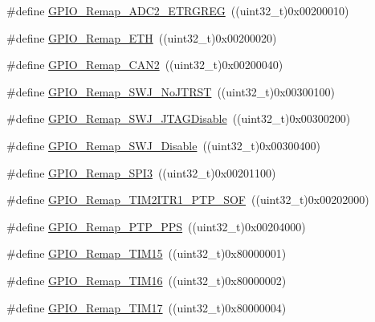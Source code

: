 \begin{DoxyCompactItemize}
\item 
\#define \mbox{\hyperlink{group___g_p_i_o___remap__define_gaa782a0c482f34507c82e4cd639bb747e}{G\+P\+I\+O\+\_\+\+Remap\+\_\+\+A\+D\+C2\+\_\+\+E\+T\+R\+G\+R\+EG}}~((uint32\+\_\+t)0x00200010)
\item 
\#define \mbox{\hyperlink{group___g_p_i_o___remap__define_gaf578688bb4d1a17fb3a103946e7c2eb7}{G\+P\+I\+O\+\_\+\+Remap\+\_\+\+E\+TH}}~((uint32\+\_\+t)0x00200020)
\item 
\#define \mbox{\hyperlink{group___g_p_i_o___remap__define_ga14c09a5050063b703fa07181afc56ee6}{G\+P\+I\+O\+\_\+\+Remap\+\_\+\+C\+A\+N2}}~((uint32\+\_\+t)0x00200040)
\item 
\#define \mbox{\hyperlink{group___g_p_i_o___remap__define_ga81009ef35f7f039365291cf4f6fc0c5b}{G\+P\+I\+O\+\_\+\+Remap\+\_\+\+S\+W\+J\+\_\+\+No\+J\+T\+R\+ST}}~((uint32\+\_\+t)0x00300100)
\item 
\#define \mbox{\hyperlink{group___g_p_i_o___remap__define_ga25fb8c789334694861444e48f486879d}{G\+P\+I\+O\+\_\+\+Remap\+\_\+\+S\+W\+J\+\_\+\+J\+T\+A\+G\+Disable}}~((uint32\+\_\+t)0x00300200)
\item 
\#define \mbox{\hyperlink{group___g_p_i_o___remap__define_gaf4832412d0ba344bb9147142cfcda828}{G\+P\+I\+O\+\_\+\+Remap\+\_\+\+S\+W\+J\+\_\+\+Disable}}~((uint32\+\_\+t)0x00300400)
\item 
\#define \mbox{\hyperlink{group___g_p_i_o___remap__define_gac7fd74244a9d53ca02cc86bb6543a689}{G\+P\+I\+O\+\_\+\+Remap\+\_\+\+S\+P\+I3}}~((uint32\+\_\+t)0x00201100)
\item 
\#define \mbox{\hyperlink{group___g_p_i_o___remap__define_ga0dc4bec540b9372479e63295fe68ac17}{G\+P\+I\+O\+\_\+\+Remap\+\_\+\+T\+I\+M2\+I\+T\+R1\+\_\+\+P\+T\+P\+\_\+\+S\+OF}}~((uint32\+\_\+t)0x00202000)
\item 
\#define \mbox{\hyperlink{group___g_p_i_o___remap__define_ga3e9d7808d1e50393afde08e4a45d18aa}{G\+P\+I\+O\+\_\+\+Remap\+\_\+\+P\+T\+P\+\_\+\+P\+PS}}~((uint32\+\_\+t)0x00204000)
\item 
\#define \mbox{\hyperlink{group___g_p_i_o___remap__define_gaead5c447875e8b384945424845452b82}{G\+P\+I\+O\+\_\+\+Remap\+\_\+\+T\+I\+M15}}~((uint32\+\_\+t)0x80000001)
\item 
\#define \mbox{\hyperlink{group___g_p_i_o___remap__define_gac9d612f9f9f9f66faecbdbbc29d2ac61}{G\+P\+I\+O\+\_\+\+Remap\+\_\+\+T\+I\+M16}}~((uint32\+\_\+t)0x80000002)
\item 
\#define \mbox{\hyperlink{group___g_p_i_o___remap__define_ga9fe98e01f8837d6a1ac4b4833f0fc45e}{G\+P\+I\+O\+\_\+\+Remap\+\_\+\+T\+I\+M17}}~((uint32\+\_\+t)0x80000004)

\end{DoxyCompactItemize}
